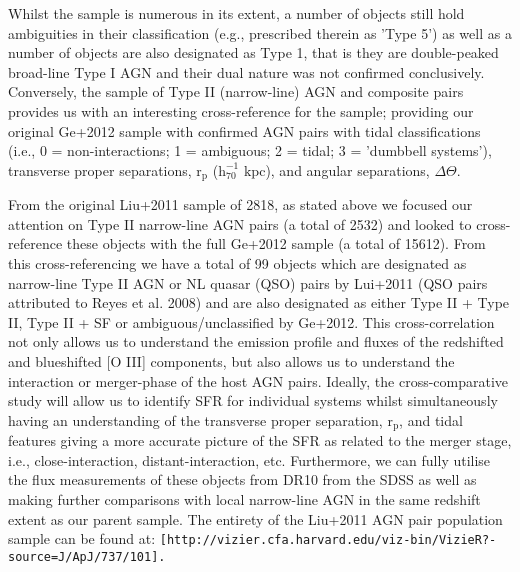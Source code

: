 Whilst the \cite{Ge_Hu_Wang_Bai_Zhang_2012} sample is numerous in its extent, a number of objects still hold ambiguities in their classification (e.g., prescribed therein as 'Type 5') as well as a number of objects are also designated as Type 1, that is they are double-peaked broad-line Type I AGN and their dual nature was not confirmed conclusively. Conversely, the \cite{Liu_2012} sample of Type II (narrow-line) AGN and composite pairs provides us with an interesting cross-reference for the \cite{Ge_Hu_Wang_Bai_Zhang_2012} sample; providing our original Ge+2012 sample with confirmed AGN pairs with tidal classifications (i.e., 0 = non-interactions; 1 = ambiguous; 2 = tidal; 3 = 'dumbbell systems'), transverse proper separations, $\text{r}_{\text{p}}$ ($\text{h}_{70}^{-1}$ $\text{kpc}$), and angular separations, $\Delta\Theta$. 

From the original Liu+2011 sample of 2818, as stated above we focused our attention on Type II narrow-line AGN pairs (a total of 2532) and looked to cross-reference these objects with the full Ge+2012 sample (a total of 15612). From this cross-referencing we have a total of 99 objects which are designated as narrow-line Type II AGN or NL quasar (QSO) pairs by Lui+2011 (QSO pairs attributed to Reyes et al. 2008) and are also designated as either Type II + Type II, Type II + SF or ambiguous/unclassified by Ge+2012. This cross-correlation not only allows us to understand the emission profile and fluxes of the redshifted and blueshifted [O III] components, but also allows us to understand the interaction or merger-phase of the host AGN pairs. Ideally, the cross-comparative study will allow us to identify SFR for individual systems whilst simultaneously having an understanding of the transverse proper separation, $\text{r}_{\text{p}}$, and tidal features giving a more accurate picture of the SFR as related to the merger stage, i.e., close-interaction, distant-interaction, etc. Furthermore, we can fully utilise the flux measurements of these objects from DR10 from the SDSS as well as making further comparisons with local narrow-line AGN in the same redshift extent as our parent sample. The entirety of the Liu+2011 AGN pair population sample can be found at: \tt{[http://vizier.cfa.harvard.edu/viz-bin/VizieR?-source=J/ApJ/737/101]}.

